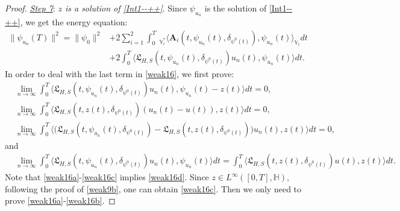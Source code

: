 \documentclass[11pt]{article}
\numberwithin{equation}{section}
\begin{document}
\begin{proof}
\underline{\emph{Step 7}}: \emph{$z$
is a solution of \eqref{Int1--++}}.
Since $\psi_{u_n}$ is the solution of \eqref{Int1--++}, we get the energy equation:
\begin{align}\label{weak16}
\|\psi_{u_n}(T)\|^2=\|\psi_0\|^2 &+2\sum_{i=1}^2\int_0^T
\ _{\mathbb{V}_i^*}\big\langle \mathbf{A}_i(t,\psi_{u_n}(t),
\delta_{\psi^0(t)}),
\psi_{u_n}(t)\big  \rangle_{\mathbb{V}_i}       dt
\nonumber\\& + 2 \int_0^T\big\langle\mathfrak{L}_{H,S}
 (t,\psi_{u_n}(t),
\delta_{\psi^0(t)})u_n(t) , \psi_{u_n}(t)\big\rangle dt.
\end{align}
In order to deal with the last term in \eqref{weak16}, we first prove:
\begin{align}\label{weak16a}
&\lim_{n\rightarrow\infty} \int_0^T\big\langle\mathfrak{L}_{H,S}
 (t,\psi_{u_n}(t),
\delta_{\psi^0(t)})u_n(t) , \psi_{u_n}(t)-z(t)\big\rangle dt=0,
\\&
\label{weak16b}
\lim_{n\rightarrow\infty}\int_{0}^T
 \big\langle \mathfrak{L}_{H,S}(t,z(t),
\delta_{\psi^0(t)})(u_n(t)-u(t)), z(t) \big\rangle dt=0,
\\\label{weak16c}
&\lim_{n\rightarrow\infty} \int_0^T\big\langle\big(\mathfrak{L}_{H,S}
 (t,\psi_{u_n}(t),
\delta_{\psi^0(t)})-\mathfrak{L}_{H,S}
 (t,z(t),
\delta_{\psi^0(t)})\big)u_n(t) , z(t)\big\rangle dt=0,
\end{align}
and
\begin{align}\label{weak16d}
&\lim_{n\rightarrow\infty} \int_0^T\big\langle\mathfrak{L}_{H,S}
 (t,\psi_{u_n}(t),
\delta_{\psi^0(t)})u_n(t) , \psi_{u_n}(t)\big\rangle dt= \int_0^T\big\langle\mathfrak{L}_{H,S}
 (t,z(t),
\delta_{\psi^0(t)})u(t) , z(t)\big\rangle dt.
\end{align}
Note that \eqref{weak16a}-\eqref{weak16c} implies \eqref{weak16d}. Since $z\in
L^\infty([0,T],\mathbb{H})$, following  the proof of \eqref{weak9b}, one can
obtain \eqref{weak16c}.
Then we only  need to prove \eqref{weak16a}-\eqref{weak16b}.



\end{proof}
\end{document}
